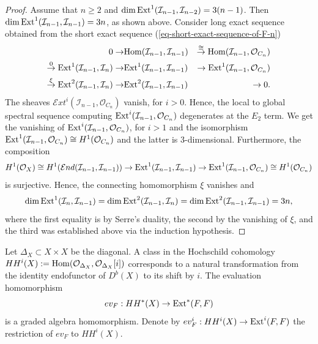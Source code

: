 \documentclass[12pt]{amsart}
\numberwithin{equation}{subsection}
\theoremstyle{plain}
\theoremstyle{definition}
\newcommand{\I}{{\mathcal I}}
\newcommand{\IsomRightArrow}{\stackrel{\cong}{\rightarrow}}
\newcommand{\RightArrowOf}[1]{\stackrel{#1}{\rightarrow}}
\newcommand{\StructureSheaf}[1]{{\mathcal O}_{#1}}
\newcommand{\rank}{{\rm rank}}
\newcommand{\Ext}{{\rm Ext}}
\newcommand{\Hom}{{\rm Hom}}
\newcommand{\SheafEnd}{{\mathcal E}nd}
\newcommand{\SheafExt}{{\mathcal E}xt}
\begin{document}
\begin{proof}
Assume that $n\geq 2$  and  $\dim \Ext^1(\I_{n-1},\I_{n-2})= 3(n-1)$. Then $\dim  \Ext^1(\I_{n-1},\I_{n-1})=3n$, as shown above. 
Consider long exact sequence obtained from the short exact sequence (\ref{eq-short-exact-sequence-of-F-n})
\begin{eqnarray*}
0 \rightarrow & \Hom(\I_{n-1},\I_{n-1})& \IsomRightArrow \Hom(\I_{n-1},\StructureSheaf{C_n})
\\
\RightArrowOf{0} \Ext^1(\I_{n-1},\I_n)\rightarrow & \Ext^1(\I_{n-1},\I_{n-1})& \rightarrow \Ext^1(\I_{n-1},\StructureSheaf{C_n})
\\
\RightArrowOf{\xi} \Ext^2(\I_{n-1},\I_n)\rightarrow & \Ext^2(\I_{n-1},\I_{n-1})& \rightarrow 0. 
\end{eqnarray*}
The sheaves $\SheafExt^i(\I_{n-1},\StructureSheaf{C_n})$ vanish, for $i>0$. Hence, the local to global spectral sequence computing $\Ext^i(\I_{n-1},\StructureSheaf{C_n})$ degenerates at the $E_2$ term. We get the 
vanishing of $\Ext^i(\I_{n-1},\StructureSheaf{C_n})$, for $i>1$ and the 
isomorphism 
$\Ext^1(\I_{n-1},\StructureSheaf{C_n})\cong H^1(\StructureSheaf{C_n})$ and the latter is $3$-dimensional. 
Furthermore, the composition 
\[
H^1(\StructureSheaf{X})\cong H^1(\SheafEnd(\I_{n-1},\I_{n-1}))\rightarrow \Ext^1(\I_{n-1},\I_{n-1})\rightarrow \Ext^1(\I_{n-1},\StructureSheaf{C_n})\cong 
H^1(\StructureSheaf{C_n})
\]
is surjective. Hence, the connecting homomorphism $\xi$ vanishes and
\[
\dim\Ext^1(\I_n,\I_{n-1})=\dim\Ext^2(\I_{n-1},\I_n)=\dim\Ext^2(\I_{n-1},\I_{n-1})=3n,
\]
where the first equality is by Serre's duality, the second by the vanishing of $\xi$, and the third was established above via the induction hypothesis.
\end{proof}




Let $\Delta_X\subset X\times X$ be the diagonal. 
A class in the Hochschild cohomology $HH^i(X):=\Hom(\StructureSheaf{\Delta_X},\StructureSheaf{\Delta_X}[i])$ corresponds to a natural transformation from the identity endofunctor of $D^b(X)$ to its shift by $i$. 
The evaluation homomorphism
\begin{equation}
\label{eq-ev-F}
ev_F:HH^*(X)\rightarrow \Ext^*(F,F)
\end{equation}
is a graded algebra homomorphism. Denote by $ev_F^i:HH^i(X)\rightarrow \Ext^i(F,F)$ the restriction of $ev_F$ to $HH^i(X)$. 
\end{document}
